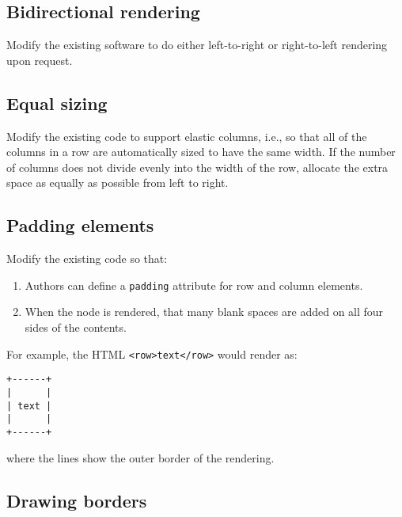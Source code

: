 \documentclass[krantzl]{krantz}
\begin{document}
\subsection*{Bidirectional rendering}


Modify the existing software to do either left-to-right or right-to-left rendering
upon request.

\subsection*{Equal sizing}


Modify the existing code to support elastic columns,
i.e.,
so that all of the columns in a row are automatically sized to have the same width.
If the number of columns does not divide evenly into the width of the row,
allocate the extra space as equally as possible from left to right.

\subsection*{Padding elements}


Modify the existing code so that:

\begin{enumerate}

\item 

Authors can define a \texttt{padding} attribute for row and column elements.



\item 

When the node is rendered, that many blank spaces are added on all four sides of the contents.



\end{enumerate}


\noindent For example, the HTML \texttt{<row>text</row>} would render as:

\begin{lstlisting}[frame=tblr]
+------+
|      |
| text |
|      |
+------+
\end{lstlisting}


\noindent where the lines show the outer border of the rendering.

\subsection*{Drawing borders}
\end{document}
